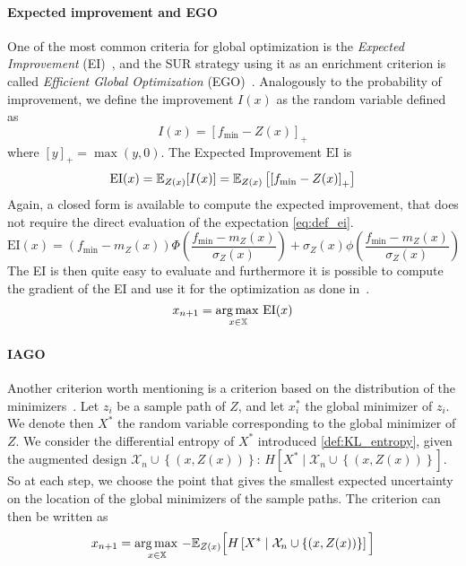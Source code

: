 \documentclass[../../Main_ManuscritThese.tex]{subfiles}
\begin{document}
\paragraph{Expected improvement and EGO}
One of the most common criteria for global optimization is the
\emph{Expected Improvement} (EI)~\cite{mockus_bayesian_1974}, and the
SUR strategy using it as an enrichment criterion is called
\emph{Efficient Global Optimization}
(EGO)~\cite{jones_efficient_1998}.  Analogously to the probability of
improvement, we define the improvement $I(x)$ as the random variable
defined as
\begin{equation}
  \label{eq:def_improvement}
  I(x) = {\left[f_{\min} - Z(x)\right]}_+
\end{equation}
where $[y]_+ = \max(y, 0)$.
The Expected Improvement $\mathrm{EI}$ is 
\begin{align}
  \label{eq:def_ei}
  \mathrm{EI}(x) = \mathbb{E}_{Z(x)}[I(x)]  = \mathbb{E}_{Z(x)}\left[\left[f_{\min} - Z(x) \right]_+\right]
\end{align}
Again, a closed form is available to compute the expected improvement,
that does not require the direct evaluation of the expectation
\cref{eq:def_ei}.
\begin{equation}
  \mathrm{EI}(x) = \left(f_{\min} - m_Z(x)\right) \Phi\left(\frac{f_{\min} - m_Z(x)}{\sigma_Z(x)}\right) + \sigma_Z(x) \phi\left(\frac{f_{\min} - m_Z(x)}{\sigma_Z(x)}\right)
\end{equation}
The EI is then quite easy to evaluate and furthermore it is possible
to compute the gradient of the EI and use it for the optimization as
done in~\cite{pardalos_differentiating_2015}.
\begin{equation}
  x_{n+1} = \operatorname*{arg\,max \,}_{x\in \mathbb{X}} \mathrm{EI}(x)
\end{equation}

\paragraph{IAGO}
\label{ssec:IAGO} Another criterion worth mentioning is a criterion
based on the distribution of the
minimizers~\cite{villemonteix_informational_2006,hennig_entropy_2011}.
Let $z_i$ be a sample path of $Z$, and let $x_i^*$ the global
minimizer of $z_i$.  We denote then $X^*$ the random variable
corresponding to the global minimizer of $Z$.  We consider the
differential entropy of $X^*$ introduced \cref{def:KL_entropy}, given
the augmented design
$\mathcal{X}_n \cup \left\{\left(x,Z(x)\right)\right\}$:
$H[X^*\mid \mathcal{X}_n \cup \left\{(x, Z(x))\right\}]$.  So at each
step, we choose the point that gives the smallest expected uncertainty
on the location of the global minimizers of the sample paths.  The
criterion can then be written as
\begin{equation}
  x_{n+1}= \operatorname*{arg\,max \,}_{x \in \mathbb{X}} -\mathbb{E}_{Z(x)}\Big[H\left[X^* \mid \mathcal{X}_n \cup \left\{(x, Z(x))\right\} \right]\Big]
\end{equation}
\end{document}
